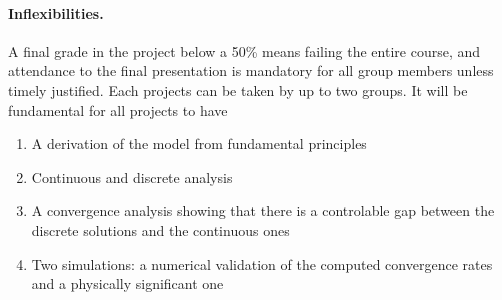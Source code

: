 \documentclass{article}
\begin{document}
\begin{enumerate}
        \paragraph{\textbf{Inflexibilities.}} A final grade in the project below a 50\% means failing the entire course, and attendance to the final presentation is mandatory for all group members unless timely justified. Each projects can be taken by up to two groups. It will be fundamental for all projects to have 
        \begin{enumerate}
            \item A derivation of the model from fundamental principles
            \item Continuous and discrete analysis
            \item A convergence analysis showing that there is a controlable gap between the discrete solutions and the continuous ones
            \item Two simulations: a numerical validation of the computed convergence rates and a physically significant one
        \end{enumerate}
\end{enumerate}
\end{document}
